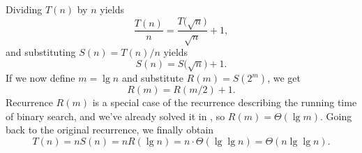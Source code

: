 Dividing $T(n)$ by $n$ yields
\[
	\frac{T(n)}{n} = \frac{T\bigl(\sqrt{n}\bigr)}{\sqrt{n}}+1,
\]
and substituting $S(n)=T(n)/n$ yields
\[
	S(n) = S\bigl(\sqrt{n}\bigr)+1.
\]
If we now define $m=\lg n$ and substitute $R(m)=S(2^m)$, we get
\[
	R(m) = R(m/2)+1.
\]
Recurrence $R(m)$ is a special case of the recurrence describing the running time of binary search, and we've already solved it in , so $R(m)=\Theta(\lg m)$.
Going back to the original recurrence, we finally obtain
\[
	T(n) = nS(n) = nR(\lg n) = n\cdot\Theta(\lg\lg n) = \Theta(n\lg\lg n).
\]
